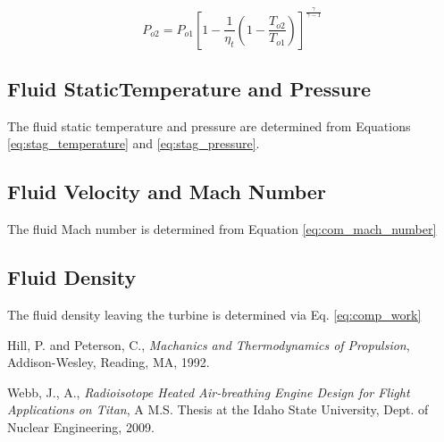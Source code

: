 \begin{equation}
\label{eq:turb_stag_pres}
P_{o2} = P_{o1}\left[1 - \frac{1}{\eta_t}\left(1 - \frac{T_{o2}}{T_{o1}} \right) \right]^{\frac{\gamma}{\gamma - 1}}
\end{equation}

\subsection{Fluid StaticTemperature and Pressure}
The fluid static temperature and pressure are determined from Equations  \ref{eq:stag_temperature} and \ref{eq:stag_pressure}.

\subsection{Fluid Velocity and Mach Number}
The fluid Mach number is determined from Equation \ref{eq:com_mach_number}

\subsection{Fluid Density}
The fluid density leaving the turbine is determined via Eq. \ref{eq:comp_work}

\begin{thebibliography}{2}

 Hill, P. and Peterson, C., \emph{Machanics and Thermodynamics of Propulsion}, Addison-Wesley, Reading, MA, 1992.

 Webb, J., A., \emph{Radioisotope Heated Air-breathing Engine Design for Flight Applications on Titan}, A M.S. Thesis at
                         the Idaho State University, Dept. of Nuclear Engineering, 2009.
\end{thebibliography}
